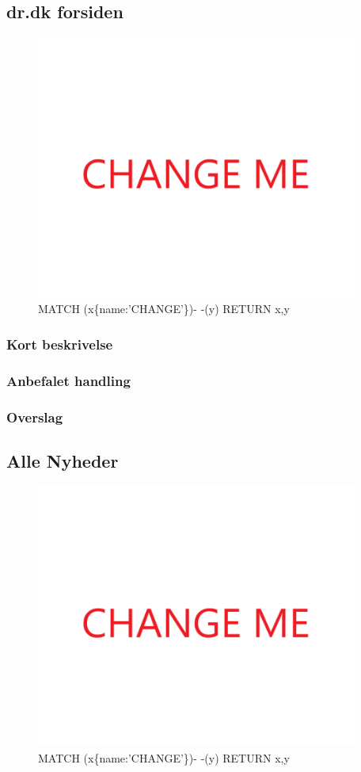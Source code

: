 \documentclass{article}
\begin{document}
\subsection{dr.dk forsiden}
\begin{figure}[h]
\includegraphics[width=300pt]{CHANGE.PNG}
\caption{MATCH (x\{name:'CHANGE'\})- -(y) RETURN x,y}
\end{figure}
\subsubsection{Kort beskrivelse}
\subsubsection{Anbefalet handling}
\subsubsection{Overslag}


\subsection{Alle Nyheder}
\begin{figure}[h]
\includegraphics[width=300pt]{CHANGE.PNG}
\caption{MATCH (x\{name:'CHANGE'\})- -(y) RETURN x,y}
\end{figure}
\end{document}

